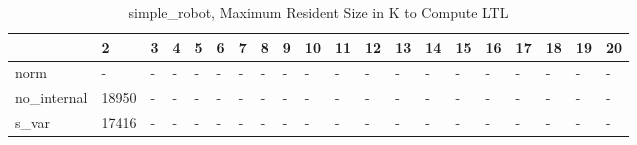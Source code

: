 \begin{table}
\caption{simple_robot, Maximum Resident Size in K to Compute LTL}
\label{simple_robot_LTL_size}
\begin{tabular}{llllllllllllllllllll}
\toprule
 & 2 & 3 & 4 & 5 & 6 & 7 & 8 & 9 & 10 & 11 & 12 & 13 & 14 & 15 & 16 & 17 & 18 & 19 & 20 \\
\midrule
norm & - & - & - & - & - & - & - & - & - & - & - & - & - & - & - & - & - & - & - \\
no_internal & 18950 & - & - & - & - & - & - & - & - & - & - & - & - & - & - & - & - & - & - \\
s_var & 17416 & - & - & - & - & - & - & - & - & - & - & - & - & - & - & - & - & - & - \\
\bottomrule
\end{tabular}
\end{table}
